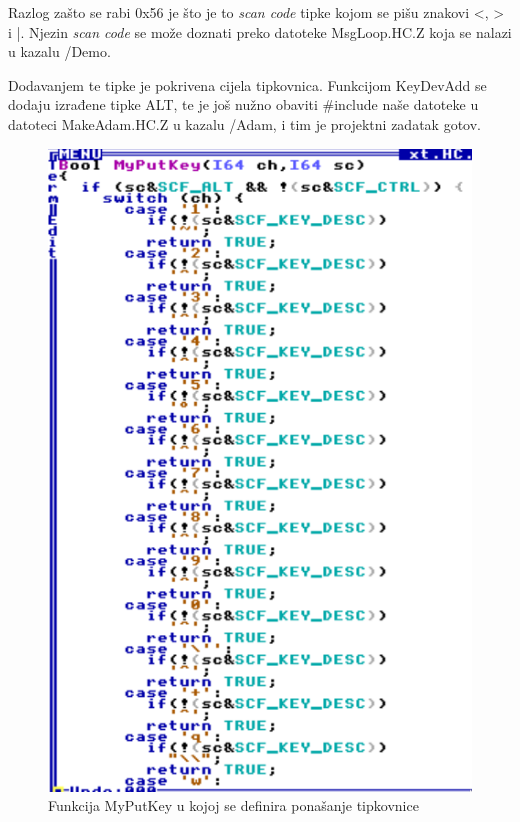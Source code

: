 \documentclass{foi}
\begin{document}
Razlog zašto se rabi {\selectfont 0x56} je što je to \emph{scan code} tipke kojom se pišu znakovi {\selectfont <}, {\selectfont >} i {\selectfont |}. Njezin \emph{scan code} se može doznati preko datoteke {\selectfont MsgLoop.HC.Z} koja se nalazi u kazalu {\selectfont /Demo}.

Dodavanjem te tipke je pokrivena cijela tipkovnica. Funkcijom {\selectfont KeyDevAdd} se dodaju izrađene tipke {\selectfont ALT}, te je još nužno obaviti {\selectfont \#include} naše datoteke u datoteci {\selectfont MakeAdam.HC.Z} u kazalu {\selectfont /Adam}, i tim je projektni zadatak gotov.

\begin{figure}[H]
    \centering
    \includegraphics[width=1.0\textwidth]{slike/altTipke1.png}
	\caption{Funkcija {\selectfont MyPutKey} u kojoj se definira ponašanje tipkovnice}
    \label{fig:altTipke1}
\end{figure}
\end{document}
